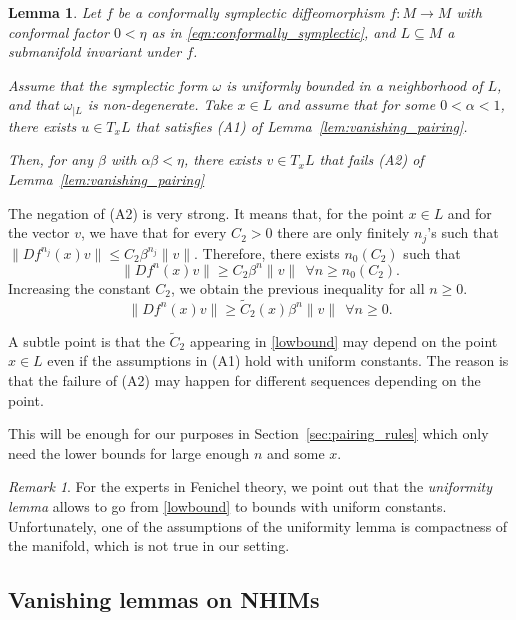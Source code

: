 \documentclass[11pt]{amsart}
\newtheorem{lem}[thm]{Lemma}
\theoremstyle{definition}
\theoremstyle{remark}
\newtheorem{rem}[thm]{Remark}
\numberwithin{equation}{section}
\begin{document}
\begin{lem}\label{cor:pairing}
Let $f$ be  a conformally symplectic  diffeomorphism $f:M\to M$ with conformal factor $0<\eta$ as in  \eqref{eqn:conformally_symplectic}, and
$L\subseteq M$  a submanifold invariant under $f$.


Assume that the symplectic form $\omega$ is  uniformly bounded in a neighborhood of $L$,
and that $\omega_{\mid L}$ is non-degenerate.
Take $x\in L$ and assume that for some $0<\alpha<1$, there exists $u\in T_xL$ that satisfies (A1) of Lemma~\ref{lem:vanishing_pairing}.

Then, for any $\beta$ with $\alpha\beta<\eta$, there exists $v\in T_xL$ that
fails (A2) of Lemma~\ref{lem:vanishing_pairing}
\end{lem}

The negation of (A2) is very strong.
It means that, for the point $x\in L$ and for the vector $v$, we have that  for every $C_2>0$ there are only finitely $n_j$'s such that $\|Df^{n_j}(x)v\|\leq C_2 \beta^{n_j}\|v\|$.
Therefore, there exists $n_0(C_2)$ such that
\[
\|Df^{n}(x)v\|\ge  C_2
\beta ^n \|v\| \ \ \forall  n\ge n_0(C_2).
\]
Increasing  the constant $C_2$, we obtain the previous  inequality for all  $n\ge 0$.
\begin{equation} \label{lowbound}
\|Df^{n}(x)v\|\ge  \tilde C_2(x)
\beta ^n \|v\| \ \ \forall n\ge 0.
\end{equation}

A subtle point is that the $\tilde{C}_2$ appearing in \eqref{lowbound}
may depend on the point $x \in L$  even if the assumptions in  (A1)
hold with uniform constants. The reason is that the failure of (A2)
may happen for different sequences depending on the point.

This will be enough for our purposes in Section~\ref{sec:pairing_rules}
which only need the lower bounds for large enough $n$ and some $x$.

\begin{rem}
  For the experts in Fenichel theory,  we point out that
  the \emph{uniformity lemma} \cite{Fenichel74} allows to go from \eqref{lowbound} to
  bounds with uniform constants. Unfortunately, one of the assumptions of
the uniformity lemma is compactness of the manifold, which is not true in our
setting.
\end{rem}




\subsection{Vanishing lemmas on NHIMs}
\end{document}
